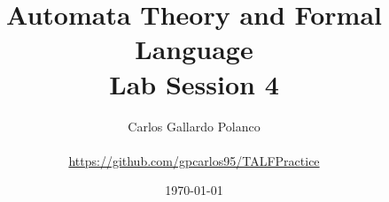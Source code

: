 \newcommand{\subject}{Automata Theory and Formal Language}
\newcommand{\practice}{Lab Session 4}

\title{\subject \\ \practice}
\author{{\large Carlos Gallardo Polanco } \\ {\small  }
             \\ {\small \url{https://github.com/gpcarlos95/TALFPractice}}}
\date{\today}
